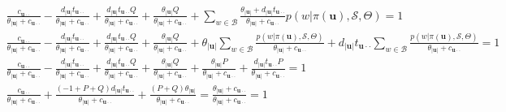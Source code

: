 \begin{equation}
\begin{split}
    \frac{c_{\mathbf{u}\cdot\cdot}}{\theta_{|\mathbf{u}|}+c_{\mathbf{u}\cdot\cdot}} - \frac{d_{|\mathbf{u}|}t_{\mathbf{u}\cdot\cdot}}{\theta_{|\mathbf{u}|}+c_{\mathbf{u}\cdot\cdot}} +  \frac{d_{|\mathbf{u}|}t_{\mathbf{u}\cdot\cdot}Q}{\theta_{|\mathbf{u}|}+c_{\mathbf{u}\cdot\cdot}} + \frac{\theta_{|\mathbf{u}|}Q}{\theta_{|\mathbf{u}|}+c_{\mathbf{u}\cdot\cdot}} + \sum_{w\in\mathcal{B}}\frac{\theta_{|\mathbf{u}|} + d_{|\mathbf{u}|}t_{\mathbf{u}\cdot\cdot}}{\theta_{|\mathbf{u}|}+c_{\mathbf{u}\cdot\cdot}} p(w | \pi(\mathbf{u}), \mathcal{S}, \Theta)= 1 \\
    \frac{c_{\mathbf{u}\cdot\cdot}}{\theta_{|\mathbf{u}|}+c_{\mathbf{u}\cdot\cdot}} - \frac{d_{|\mathbf{u}|}t_{\mathbf{u}\cdot\cdot}}{\theta_{|\mathbf{u}|}+c_{\mathbf{u}\cdot\cdot}} +  \frac{d_{|\mathbf{u}|}t_{\mathbf{u}\cdot\cdot}Q}{\theta_{|\mathbf{u}|}+c_{\mathbf{u}\cdot\cdot}} + \frac{\theta_{|\mathbf{u}|}Q}{\theta_{|\mathbf{u}|}+c_{\mathbf{u}\cdot\cdot}} + \theta_{|\mathbf{u}|}\sum_{w\in\mathcal{B}}\frac{p(w | \pi(\mathbf{u}), \mathcal{S}, \Theta)}{\theta_{|\mathbf{u}|}+c_{\mathbf{u}\cdot\cdot}}  + d_{|\mathbf{u}|}t_{\mathbf{u}\cdot\cdot}\sum_{w\in\mathcal{B}}\frac{ p(w | \pi(\mathbf{u}), \mathcal{S}, \Theta)}{\theta_{|\mathbf{u}|}+c_{\mathbf{u}\cdot\cdot}}= 1 \\ 
    \frac{c_{\mathbf{u}\cdot\cdot}}{\theta_{|\mathbf{u}|}+c_{\mathbf{u}\cdot\cdot}} - \frac{d_{|\mathbf{u}|}t_{\mathbf{u}\cdot\cdot}}{\theta_{|\mathbf{u}|}+c_{\mathbf{u}\cdot\cdot}} +  \frac{d_{|\mathbf{u}|}t_{\mathbf{u}\cdot\cdot}Q}{\theta_{|\mathbf{u}|}+c_{\mathbf{u}\cdot\cdot}} + \frac{\theta_{|\mathbf{u}|}Q}{\theta_{|\mathbf{u}|}+c_{\mathbf{u}\cdot\cdot}} + \frac{\theta_{|\mathbf{u}|}P}{\theta_{|\mathbf{u}|}+c_{\mathbf{u}\cdot\cdot}}  + \frac{ d_{|\mathbf{u}|}t_{\mathbf{u}\cdot\cdot}P}{\theta_{|\mathbf{u}|}+c_{\mathbf{u}\cdot\cdot}}= 1 \\
    \frac{c_{\mathbf{u}\cdot\cdot}}{\theta_{|\mathbf{u}|}+c_{\mathbf{u}\cdot\cdot}} + \frac{(-1+P+Q)d_{|\mathbf{u}|}t_{\mathbf{u}\cdot\cdot}}{\theta_{|\mathbf{u}|}+c_{\mathbf{u}\cdot\cdot}} +  \frac{(P+Q)\theta_{|\mathbf{u}|}}{\theta_{|\mathbf{u}|}+c_{\mathbf{u}\cdot\cdot}} = \frac{\theta_{|\mathbf{u}|} + c_{\mathbf{u}\cdot\cdot}}{\theta_{|\mathbf{u}|}+c_{\mathbf{u}\cdot\cdot}}  = 1
\end{split}\label{app:der}
\end{equation}

